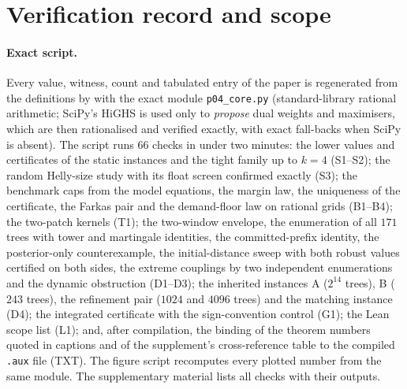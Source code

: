 \section{Verification record and scope}\label{sec:verification}

\paragraph{Exact script.} Every value, witness, count and tabulated entry of the paper is regenerated from the definitions by  with the exact module \texttt{p04\_core.py} (standard-library rational arithmetic; SciPy's HiGHS is used only to \emph{propose} dual weights and maximisers, which are then rationalised and verified exactly, with exact fall-backs when SciPy is absent). The script runs $66$ checks in under two minutes: the lower values and certificates of the static instances and the tight family up to $k=4$ (S1--S2); the random Helly-size study with its float screen confirmed exactly (S3); the benchmark caps from the model equations, the margin law, the uniqueness of the certificate, the Farkas pair and the demand-floor law on rational grids (B1--B4); the two-patch kernels (T1); the two-window envelope, the enumeration of all $171$ trees with tower and martingale identities, the committed-prefix identity, the posterior-only counterexample, the initial-distance sweep with both robust values certified on both sides, the extreme couplings by two independent enumerations and the dynamic obstruction (D1--D3); the inherited instances A ($2^{14}$ trees), B ($243$ trees), the refinement pair ($1024$ and $4096$ trees) and the matching instance (D4); the integrated certificate with the sign-convention control (G1); the Lean scope list (L1); and, after compilation, the binding of the theorem numbers quoted in captions and of the supplement's cross-reference table to the compiled \texttt{.aux} file (TXT). The figure script recomputes every plotted number from the same module. The supplementary material lists all checks with their outputs.

